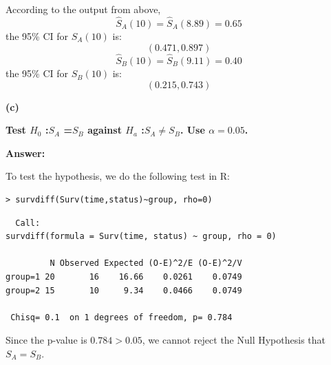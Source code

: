 \documentclass[letterpaper,11pt]{article}
\begin{document}
According to the output from above,
$$\hat{S}_A(10) = \hat{S}_A(8.89) = 0.65$$
the 95\% CI for $\hat{S}_A(10)$ is:
$$(0.471, 0.897)$$
$$\hat{S}_B(10) = \hat{S}_B(9.11) = 0.40$$
the 95\% CI for $\hat{S}_B(10)$ is:
$$(0.215,0.743)$$



\begin{addmargin}[-1.1em]{0em}
  \textbf{(c)}\par
\end{addmargin}
\textbf{Test $H_0$ :$S_A$ =$S_B$ against $H_a$ :$S_A \neq S_B$. Use $\alpha=0.05$.}\par
\bigbreak
\begin{addmargin}[-0.5em]{0em}
  \textbf{Answer: }
\end{addmargin}
To test the hypothesis, we do the following test in R:
\begin{lstlisting}
> survdiff(Surv(time,status)~group, rho=0)
\end{lstlisting}

\begin{lstlisting}
  Call:
survdiff(formula = Surv(time, status) ~ group, rho = 0)

         N Observed Expected (O-E)^2/E (O-E)^2/V
group=1 20       16    16.66    0.0261    0.0749
group=2 15       10     9.34    0.0466    0.0749

 Chisq= 0.1  on 1 degrees of freedom, p= 0.784
\end{lstlisting}
Since the p-value is $0.784 > 0.05$, we cannot reject the Null Hypothesis that $S_A = S_B$.
\end{document}

